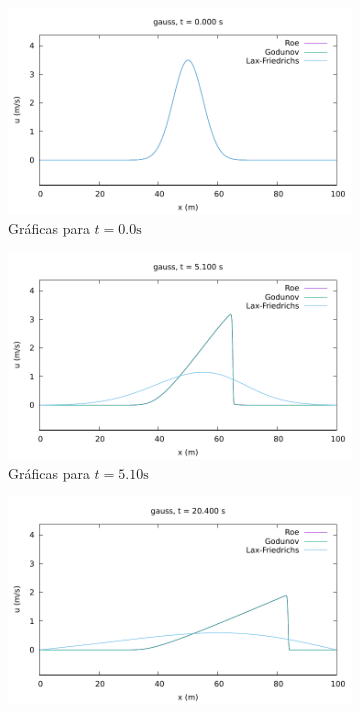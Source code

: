 \documentclass[12pt]{article}
\begin{document}
 	\begin{figure}[ht]
 		\centering
 		\begin{subfigure}[b]{0.4\textwidth}
 			\includegraphics[width=\textwidth]{../burgers1DVF/results/sol_fijas/gauss/000.pdf}
 			\caption*{Gráficas para $t=0.0\unit{\second}$}
 			\label{fig:gauss-fija1}
 		\end{subfigure}
 		\hfill
 		\begin{subfigure}[b]{0.4\textwidth}
 			\includegraphics[width=\textwidth]{../burgers1DVF/results/sol_fijas/gauss/170.pdf}
 			\caption*{Gráficas para $t=5.10\unit{\second}$}
 			\label{fig:gauss-fija2}
 		\end{subfigure}
% 		
 		\par\medskip
 		\begin{subfigure}[b]{0.4\textwidth}
 			\includegraphics[width=\textwidth]{../burgers1DVF/results/sol_fijas/gauss/680.pdf}

\end{subfigure}
\end{figure}
\end{document}
